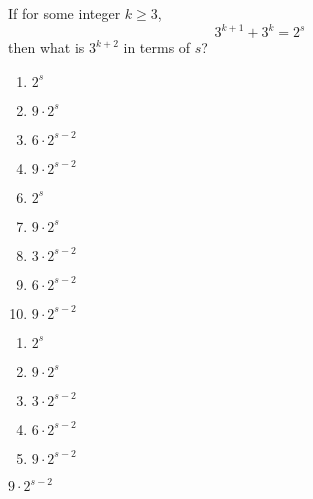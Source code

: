 



  If for some integer $k\geq 3$, \[3^{k+1}+3^{k}=2^{s}\] then what is $3^{k+2}$ in terms of $s$?\\



\ifsat
	\begin{enumerate}[label=\Alph*)]
		\item   $2^{s}$
		\item  $9\cdot 2^{s}$
		\item  $6\cdot2^{s-2}$
		\item   $9\cdot2^{s-2}$%
	\end{enumerate}
\else
\fi

\ifacteven
	\begin{enumerate}[label=\textbf{\Alph*.},itemsep=\fill,align=left]
		\setcounter{enumii}{5}
		\item   $2^{s}$
		\item  $9\cdot 2^{s}$
		\item  $3\cdot2^{s-2}$
		\addtocounter{enumii}{1}
		\item  $6\cdot2^{s-2}$
		\item   $9\cdot2^{s-2}$%
	\end{enumerate}
\else
\fi

\ifactodd
	\begin{enumerate}[label=\textbf{\Alph*.},itemsep=\fill,align=left]
		\item   $2^{s}$
		\item  $9\cdot 2^{s}$
		\item  $3\cdot2^{s-2}$
		\item  $6\cdot2^{s-2}$
		\item   $9\cdot2^{s-2}$%
	\end{enumerate}
\else
\fi

\ifgridin
   $9\cdot2^{s-2}$%

\else
\fi


